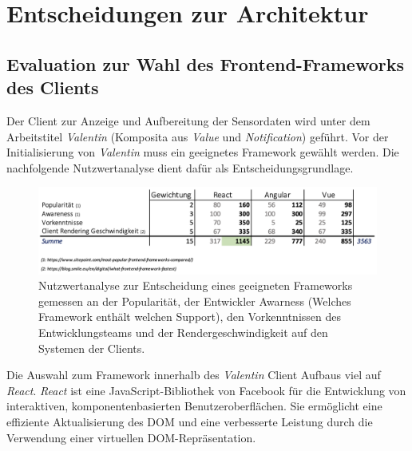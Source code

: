 \documentclass[
]{article}
\begin{document}
\section{Entscheidungen zur Architektur}
\subsection{Evaluation zur Wahl des Frontend-Frameworks des Clients}

Der Client zur Anzeige und Aufbereitung der Sensordaten wird unter dem Arbeitstitel \textit{Valentin} (Komposita aus \textit{Value} und \textit{Notification}) geführt. Vor der Initialisierung von \textit{Valentin} muss ein geeignetes Framework gewählt werden. Die nachfolgende Nutzwertanalyse dient dafür als Entscheidungsgrundlage. 

\begin{figure}
  \centering
  \includegraphics[width=1\textwidth]{./resources/techevaluationfe.png}
  \caption{Nutzwertanalyse zur Entscheidung eines geeigneten Frameworks gemessen an der Popularität, der Entwickler Awarness (Welches Framework enthält welchen Support), den Vorkenntnissen des Entwicklungsteams und der Rendergeschwindigkeit auf den Systemen der Clients.}
  \label{fig:deine_label}
\end{figure}

Die Auswahl zum Framework innerhalb des \textit{Valentin} Client Aufbaus viel auf \textit{React}. \textit{React} ist eine JavaScript-Bibliothek von Facebook für die Entwicklung von interaktiven, komponentenbasierten Benutzeroberflächen. Sie ermöglicht eine effiziente Aktualisierung des DOM und eine verbesserte Leistung durch die Verwendung einer virtuellen DOM-Repräsentation.
\end{document}
